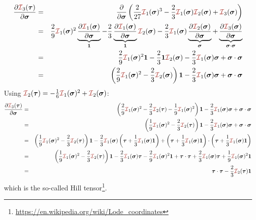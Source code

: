 \begin{eqnarray}
\frac{\partial {\III}_3(\bm\tau)}{\partial \bm\sigma} 
&=&
\frac{\partial }{\partial \bm\sigma} 
\left( \frac{2}{27} {\III}_1(\bm\sigma)^3 
- \frac{2}{3} {\III}_1(\bm\sigma){\III}_2(\bm\sigma) + {\III}_3(\bm\sigma) \right) \nn\\
&=& 
\frac{2}{9} {\III}_1(\bm\sigma)^2  
\underbrace{ \frac{\partial  {\III}_1(\bm\sigma)}{\partial \bm\sigma} }_{\bm 1} 
-\frac23 
\underbrace{ \frac{\partial {\III}_1(\bm\sigma)}{\partial \bm\sigma}}_{\bm 1}   {\III}_2(\bm\sigma) 
-\frac23 {\III}_1(\bm\sigma)  
\underbrace{ \frac{\partial  {\III}_2(\bm\sigma)}{\partial \bm\sigma} }_{\bm \sigma}
+ 
\underbrace{\frac{\partial {\III}_3(\bm\sigma)}{\partial \bm\sigma}}_{\bm\sigma\cdot\bm\sigma}  \nn\\
&=& 
\frac{2}{9} {\III}_1(\bm\sigma)^2 {\bm 1} 
-\frac23 {\bm 1}   {\III}_2(\bm\sigma) 
-\frac23 {\III}_1(\bm\sigma)  {\bm \sigma}
+ \bm\sigma\cdot\bm\sigma \nn\\
&=& \left(\frac29 {\III}_1(\bm\sigma)^2 - \frac23  {\III}_2(\bm\sigma)    \right)  {\bm 1}
-\frac23 {\III}_1(\bm\sigma)  {\bm \sigma}
+ \bm\sigma\cdot\bm\sigma
\end{eqnarray}
Using ${\III}_2(\bm\tau) = -\frac16 {\III}_1(\bm\sigma)^2 + {\III}_2(\bm\sigma)$:
\begin{eqnarray}
\frac{\partial {\III}_3(\bm\tau)}{\partial \bm\sigma} 
&=& \left(\frac29 {\III}_1(\bm\sigma)^2 - \frac23  {\III}_2(\bm\tau) 
-\frac19 {\III}_1(\bm\sigma)^2    \right)  {\bm 1}
-\frac23 {\III}_1(\bm\sigma)  {\bm \sigma}
+ \bm\sigma\cdot\bm\sigma \nn\\
&=& \left(\frac19 {\III}_1(\bm\sigma)^2 - \frac23  {\III}_2(\bm\tau) \right)  {\bm 1}
-\frac23 {\III}_1(\bm\sigma)  {\bm \sigma}
+ \bm\sigma\cdot\bm\sigma \nn\\
&=& \left(\frac19 {\III}_1(\bm\sigma)^2 - \frac23  {\III}_2(\bm\tau) \right)  {\bm 1}
-\frac23 {\III}_1(\bm\sigma)  \left( \bm\tau + \frac13 {\III}_1(\bm\sigma) {\bm 1} \right)
+ \left( \bm\tau + \frac13 {\III}_1(\bm\sigma) {\bm 1} \right)
\cdot \left( \bm\tau + \frac13 {\III}_1(\bm\sigma) {\bm 1} \right) \nn\\
&=& \left(\frac19 {\III}_1(\bm\sigma)^2 - \frac23  {\III}_2(\bm\tau) \right)  {\bm 1}
-\frac23 {\III}_1(\bm\sigma)  \bm\tau 
-\frac29 {\III}_1(\bm\sigma)^2   {\bm 1}
+ \bm\tau\cdot\bm\tau
+\frac23  {\III}_1(\bm\sigma) \bm\tau
+\frac19 {\III}_1(\bm\sigma)^2   {\bm 1} \nn\\
&=&
\bm\tau\cdot\bm\tau
-
\frac23  {\III}_2(\bm\tau)  {\bm 1}
\end{eqnarray}
which is the so-called Hill tensor\footnote{\url{https://en.wikipedia.org/wiki/Lode_coordinates}}.

